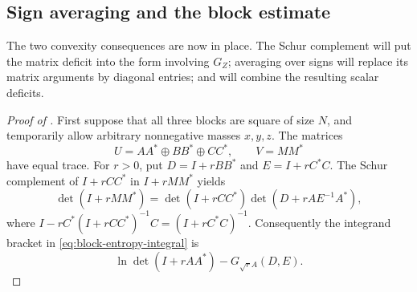 \subsection{Sign averaging and the block estimate}

The two convexity consequences are now in place. The Schur complement
will put the matrix deficit into the form involving $G_Z$; averaging
over signs will replace its matrix arguments by diagonal entries;
and  will combine the resulting scalar deficits.

\begin{proof}[Proof of ]
First suppose that all three blocks are square of size $N$, and
temporarily allow arbitrary nonnegative masses $x,y,z$.
The matrices
\[
 U=AA^*\oplus BB^*\oplus CC^*,\qquad V=MM^*
\]
have equal trace. For $r>0$, put $D=I+rBB^*$ and $E=I+rC^*C$.
The Schur complement of $I+rCC^*$ in $I+rMM^*$ yields
\begin{equation}\label{eq:block-schur}
 \det(I+rMM^*)
 =\det(I+rCC^*)\det(D+rAE^{-1}A^*),
\end{equation}
where
$I-rC^*(I+rCC^*)^{-1}C=(I+rC^*C)^{-1}$.
Consequently the integrand bracket in \eqref{eq:block-entropy-integral}
is
\begin{equation}\label{eq:block-integrand}
 \ln\det(I+rAA^*)-G_{\sqrt r A}(D,E).
\end{equation}


\end{proof}

